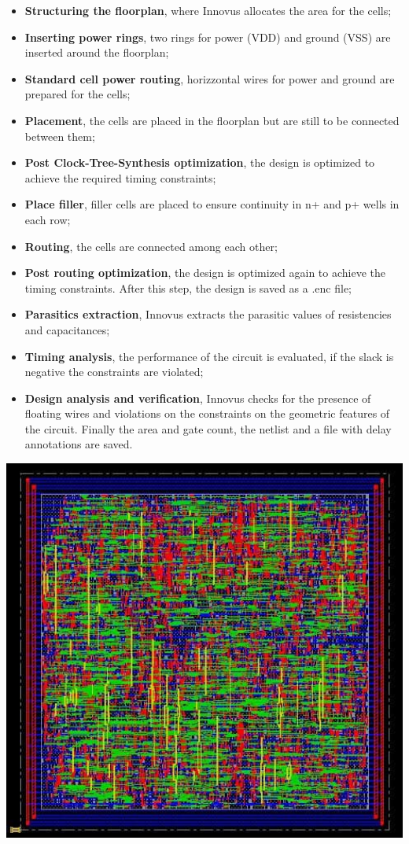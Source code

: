 \begin{itemize}
    \item \textbf{Structuring the floorplan}, where Innovus allocates the area for the cells;
    \item \textbf{Inserting power rings}, two rings for power (VDD) and ground (VSS) are inserted around the floorplan;  
    \item \textbf{Standard cell power routing}, horizzontal wires for power and ground are prepared for the cells;
    \item \textbf{Placement}, the cells are placed in the floorplan but are still to be connected between them;
    \item \textbf{Post Clock-Tree-Synthesis optimization}, the design is optimized to achieve the required timing constraints;
    \item \textbf{Place filler}, filler cells are placed to ensure continuity in n+ and p+ wells in each row;
    \item \textbf{Routing}, the cells are connected among each other;
    \item \textbf{Post routing optimization}, the design is optimized again to achieve the timing constraints. After this step, the design is saved as a .enc file;
    \item \textbf{Parasitics extraction}, Innovus extracts the parasitic values of resistencies and capacitances;
    \item \textbf{Timing analysis}, the performance of the circuit is evaluated, if the slack is negative the constraints are violated;
    \item \textbf{Design analysis and verification}, Innovus checks for the presence of floating wires and violations on the constraints on the geometric features of the circuit. 
    Finally the area and gate count, the netlist and a file with delay annotations are saved.
\end{itemize}


\centerline{
\includegraphics[width=15.5cm]{./chapters/figures/fir_base_plcrt.jpg}}

